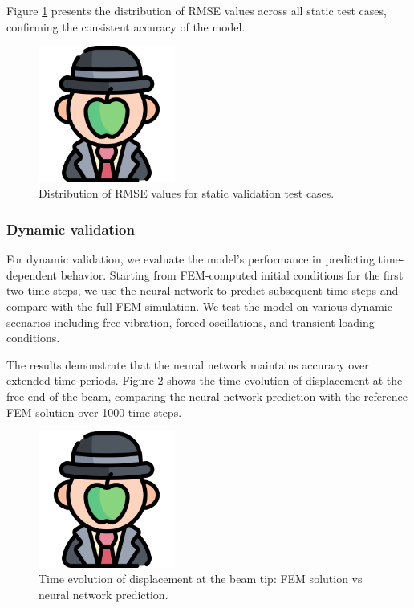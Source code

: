 Figure \ref{fig:static_rmse_distribution} presents the distribution of RMSE values across all static test cases, confirming the consistent accuracy of the model.

\begin{figure}[H]
    \centering
    \includegraphics[width=0.4\textwidth]{Images/dummy.png}
    \caption{Distribution of RMSE values for static validation test cases.}
    \label{fig:static_rmse_distribution}
\end{figure}

\subsubsection{Dynamic validation}
\label{sec:dynamic_validation}
For dynamic validation, we evaluate the model's performance in predicting time-dependent behavior. Starting from FEM-computed initial conditions for the first two time steps, we use the neural network to predict subsequent time steps and compare with the full FEM simulation. We test the model on various dynamic scenarios including free vibration, forced oscillations, and transient loading conditions.

The results demonstrate that the neural network maintains accuracy over extended time periods. Figure \ref{fig:dynamic_validation_time_series} shows the time evolution of displacement at the free end of the beam, comparing the neural network prediction with the reference FEM solution over 1000 time steps.

\begin{figure}[H]
    \centering
    \includegraphics[width=0.4\textwidth]{Images/dummy.png}
    \caption{Time evolution of displacement at the beam tip: FEM solution vs neural network prediction.}
    \label{fig:dynamic_validation_time_series}
\end{figure}

